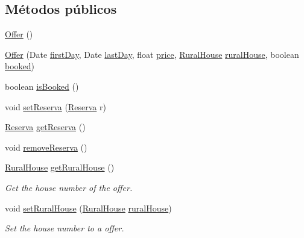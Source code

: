\subsection*{Métodos públicos}
\begin{DoxyCompactItemize}
\item 
\mbox{\hyperlink{classdomain_1_1_offer_ae82665e8df101e5a20b41dc06f74a789}{Offer}} ()
\item 
\mbox{\hyperlink{classdomain_1_1_offer_a1ce77b36180799819b2446b57fc3fcfe}{Offer}} (Date \mbox{\hyperlink{classdomain_1_1_offer_ac30c7d7ca38555fecc523259c15bd6b0}{first\+Day}}, Date \mbox{\hyperlink{classdomain_1_1_offer_a4d415274c0e120dd3e66e4ad46d7e2b2}{last\+Day}}, float \mbox{\hyperlink{classdomain_1_1_offer_a194cfe9363c5bd9e745f56978b03e7fd}{price}}, \mbox{\hyperlink{classdomain_1_1_rural_house}{Rural\+House}} \mbox{\hyperlink{classdomain_1_1_offer_a122573abd92911b25cde7d7e84f488f5}{rural\+House}}, boolean \mbox{\hyperlink{classdomain_1_1_offer_afe1b48d0d80d84147a51b8dff9dfb50d}{booked}})
\item 
boolean \mbox{\hyperlink{classdomain_1_1_offer_a41a1c7ea6658ff5e9127ad3d2332ef9c}{is\+Booked}} ()
\item 
void \mbox{\hyperlink{classdomain_1_1_offer_aaeea4dfcf319bd7003aa46054c50594b}{set\+Reserva}} (\mbox{\hyperlink{classdomain_1_1_reserva}{Reserva}} r)
\item 
\mbox{\hyperlink{classdomain_1_1_reserva}{Reserva}} \mbox{\hyperlink{classdomain_1_1_offer_a89339961be734e54a45fab7867120736}{get\+Reserva}} ()
\item 
void \mbox{\hyperlink{classdomain_1_1_offer_a78634284385de3610a3fdc8ef08763fa}{remove\+Reserva}} ()
\item 
\mbox{\hyperlink{classdomain_1_1_rural_house}{Rural\+House}} \mbox{\hyperlink{classdomain_1_1_offer_a3804f5f9ad3a3bf380e55389ccfa9dba}{get\+Rural\+House}} ()
\begin{DoxyCompactList}\small\item\em Get the house number of the offer. \end{DoxyCompactList}\item 
void \mbox{\hyperlink{classdomain_1_1_offer_a2050ed4cf76a2a2863d08e89bdf4a7df}{set\+Rural\+House}} (\mbox{\hyperlink{classdomain_1_1_rural_house}{Rural\+House}} \mbox{\hyperlink{classdomain_1_1_offer_a122573abd92911b25cde7d7e84f488f5}{rural\+House}})
\begin{DoxyCompactList}\small\item\em Set the house number to a offer. \end{DoxyCompactList}\item 

\end{DoxyCompactItemize}
